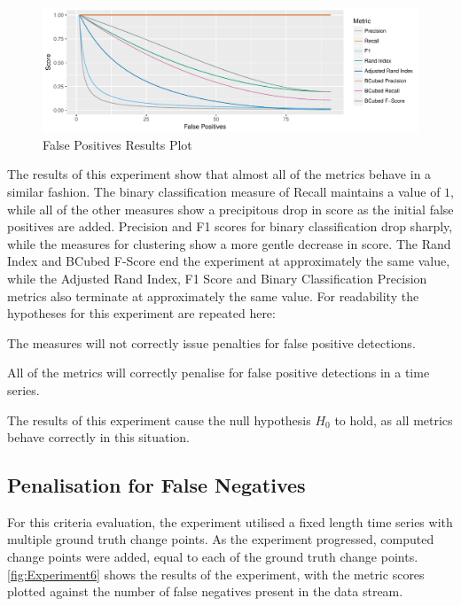 \documentclass[../main.tex]{subfiles}
\begin{document}
\begin{figure}[h]
    \includegraphics[width=\textwidth]{figures/Experiment5}
    \caption{False Positives Results Plot}
    \label{fig:Experiment5}
\end{figure}

The results of this experiment show that almost all of the metrics behave in a similar fashion. The binary classification measure of Recall maintains a value of $1$, while all of the other measures show a precipitous drop in score as the initial false positives are added. Precision and F1 scores for binary classification drop sharply, while the measures for clustering show a more gentle decrease in score. The Rand Index and BCubed F-Score end the experiment at approximately the same value, while the Adjusted Rand Index, F1 Score and Binary Classification Precision metrics also terminate at approximately the same value. For readability the hypotheses for this experiment are repeated here:

\begin{hypothesis*}
    The measures will not correctly issue penalties for false positive detections.
\end{hypothesis*}

\begin{nullhypothesis*}
    All of the metrics will correctly penalise for false positive detections in a time series.
\end{nullhypothesis*}

The results of this experiment cause the null hypothesis $H_0$ to hold, as all metrics behave correctly in this situation.

\subsection{Penalisation for False Negatives}

For this criteria evaluation, the experiment utilised a fixed length time series with multiple ground truth change points. As the experiment progressed, computed change points were added, equal to each of the ground truth change points. \autoref{fig:Experiment6} shows the results of the experiment, with the metric scores plotted against the number of false negatives present in the data stream.
\end{document}

